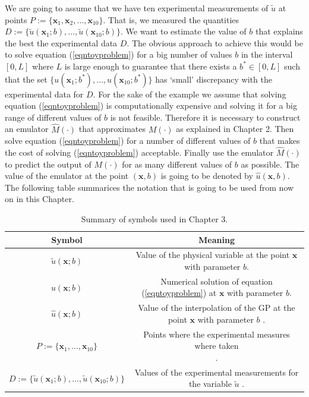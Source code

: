 \documentclass[12pt]{book}
\newcommand{\x}{\textbf{x}}
\begin{document}
We are going to assume that we have ten experimental measurements 
of $\tilde{u}$ at points $P:=\{\x_{1},\x_{2},\ldots,\x_{10}\}$. That is, we measured the quantities 
$D:=\{\tilde{u}(\x_{1};b),\ldots,\tilde{u}(\x_{10};b)\}$.
We want to estimate the value of $b$ that explains the best the experimental data $D$. The obvious approach to achieve this
would be to solve equation (\ref{eqntoyproblem}) for a big number of values $b$ in the interval $[0,L]$ where $L$ 
is large enough to guarantee that there exists a $b^{*}\in [0,L]$ such that the set $\{u(\x_{1};b^{*}),\ldots,u(\x_{10};b^{*})\}$
has `small' discrepancy with the experimental data for $D$. For the sake of the example we assume that solving
equation (\ref{eqntoyproblem}) is computationally expensive and solving it for a big range of different values of $b$
is not feasible. Therefore it is necessary to construct an emulator $\hat{M}(\cdot)$ that approximates $M(\cdot)$ as
explained in  Chapter 2.  Then solve equation (\ref{eqntoyproblem}) for a number of 
different values of  $b$
that makes the cost of solving (\ref{eqntoyproblem})  acceptable. Finally use the emulator
$\hat{M}(\cdot)$ to predict the output of $M(\cdot)$ for as many different values of $b$ as possible. 
The value of the emulator at the point $(\x,b)$  is going to be denoted by $\hat{u}(\x,b)$. The following
table summarices the notation that is going to be used from now on in this Chapter.

\begin{table}[H]
\centering
\begin{tabular}{|c|c|}
\hline 
Symbol & Meaning \tabularnewline 
\hline 
\hline
\hline 
$\tilde{u}(\x;b)$ & \pbox{7cm}{Value of the physical variable at the point $\x$
with parameter $b$.\\} \tabularnewline 
\hline 
\hline
$u(\x;b)$ & \pbox{7cm}{Numerical solution of equation (\ref{eqntoyproblem})
at $\x$ with parameter $b$.\\} \tabularnewline
\hline
\hline 
$\hat{u}(\x;b)$ & \pbox{7cm}{Value of the interpolation of the GP at the point $\x$ with parameter
$b$\\}.  \tabularnewline
\hline
\hline 
$P:=\{\x_{1},\ldots,\x_{10}\}$ & \pbox{7cm}{Points where the experimental measures where taken\\}.  \tabularnewline
\hline
\hline 
$D:=\{\tilde{u}(\x_{1};b),\ldots,\tilde{u}(\x_{10};b)\}$ & \pbox{7cm}{Values of the experimental measurements for the variable $\tilde{u}$\\}.  \tabularnewline
\hline
\end{tabular}

\caption{Summary of symbols used in Chapter 3.}
\label{tabSymboltable}
\end{table}
\end{document}
